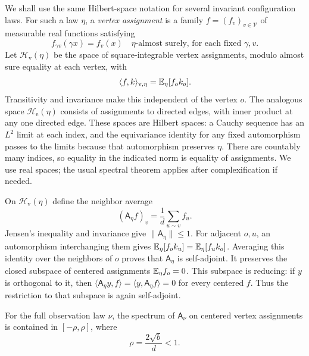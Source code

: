 We shall use the same Hilbert-space notation for several invariant
configuration laws.  For such a law \(\eta\), a \emph{vertex
assignment} is a family \(f=(f_v)_{v\in\mathcal V}\) of measurable
real functions satisfying
\[
 f_{\gamma v}(\gamma x)=f_v(x)
 \quad\text{\(\eta\)-almost surely, for each fixed \(\gamma,v\)}.
\]
Let \(\mathcal H_{\mathrm v}(\eta)\) be the space of square-integrable
vertex assignments, modulo almost sure equality at each vertex, with
\[
 \langle f,k\rangle_{\mathrm v,\eta}=\mathbb E_\eta[f_ok_o].
\]
Transitivity and invariance make this independent of the vertex \(o\).
The analogous space \(\mathcal H_{\mathrm e}(\eta)\) consists of
assignments to directed edges, with inner product at any one directed
edge.  These spaces are Hilbert spaces: a Cauchy sequence has an
\(L^2\) limit at each index, and the equivariance identity for any
fixed automorphism passes to the limits because that automorphism
preserves \(\eta\).  There are countably many indices, so equality in
the indicated norm is equality of assignments.  We use real spaces;
the usual spectral theorem applies after complexification if needed.

On \(\mathcal H_{\mathrm v}(\eta)\) define the neighbor average
\[
 (\mathsf A_\eta f)_v=\frac1d\sum_{u\sim v}f_u.
\]
Jensen's inequality and invariance give \(\|\mathsf A_\eta\|\le1\).
For adjacent \(o,u\), an automorphism interchanging them gives
\(\mathbb E_\eta[f_ok_u]=\mathbb E_\eta[f_uk_o]\).  Averaging this identity over
the neighbors of \(o\) proves that \(\mathsf A_\eta\) is self-adjoint.
It preserves the closed subspace of centered assignments
\(\mathbb E_\eta f_o=0\).  This subspace is reducing: if \(y\) is
orthogonal to it, then
\(\langle \mathsf A_\eta y,f\rangle
=\langle y,\mathsf A_\eta f\rangle=0\)
for every centered \(f\).  Thus the restriction to that subspace
is again self-adjoint.

\begin{lemma}
\label{lem:marginal-spectrum}
For the full observation law \(\nu\), the spectrum of \(\mathsf A_\nu\)
on centered vertex assignments is contained in \([-\rho,\rho]\), where
\begin{equation}
\label{eq:spectrum-rho}
 \rho=\frac{2\sqrt b}{d}<1.
\end{equation}
\end{lemma}


